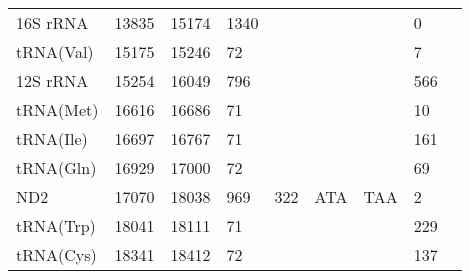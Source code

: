 \documentclass[../DISSERTACAO_MAIN.tex]{subfiles}
\begin{document}
\begin{longtable}{llllllllllllllllllllll}
			16S 				rRNA & \multicolumn{2}{l}{13835}   & \multicolumn{2}{l}{15174}   & \multicolumn{2}{l}{1340}        & \multicolumn{3}{l}{}                          & \multicolumn{3}{l}{}      & \multicolumn{3}{l}{}        & \multicolumn{3}{l}{0}           & \multicolumn{3}{l}{}         \\
			tRNA(Val)    & \multicolumn{2}{l}{15175}   & \multicolumn{2}{l}{15246}   & \multicolumn{2}{l}{72}          & \multicolumn{3}{l}{}                          & \multicolumn{3}{l}{}      & \multicolumn{3}{l}{}        & \multicolumn{3}{l}{7}           & \multicolumn{3}{l}{}         \\
			12S 				rRNA & \multicolumn{2}{l}{15254}   & \multicolumn{2}{l}{16049}   & \multicolumn{2}{l}{796}         & \multicolumn{3}{l}{}                          & \multicolumn{3}{l}{}      & \multicolumn{3}{l}{}        & \multicolumn{3}{l}{566}         & \multicolumn{3}{l}{}         \\
			tRNA(Met)    & \multicolumn{2}{l}{16616}   & \multicolumn{2}{l}{16686}   & \multicolumn{2}{l}{71}          & \multicolumn{3}{l}{}                          & \multicolumn{3}{l}{}      & \multicolumn{3}{l}{}        & \multicolumn{3}{l}{10}          & \multicolumn{3}{l}{}         \\
			tRNA(Ile)    & \multicolumn{2}{l}{16697}   & \multicolumn{2}{l}{16767}   & \multicolumn{2}{l}{71}          & \multicolumn{3}{l}{}                          & \multicolumn{3}{l}{}      & \multicolumn{3}{l}{}        & \multicolumn{3}{l}{161}         & \multicolumn{3}{l}{}         \\
			tRNA(Gln)    & \multicolumn{2}{l}{16929}   & \multicolumn{2}{l}{17000}   & \multicolumn{2}{l}{72}          & \multicolumn{3}{l}{}                          & \multicolumn{3}{l}{}      & \multicolumn{3}{l}{}        & \multicolumn{3}{l}{69}          & \multicolumn{3}{l}{}         \\
			ND2          & \multicolumn{2}{l}{17070}   & \multicolumn{2}{l}{18038}   & \multicolumn{2}{l}{969}         & \multicolumn{3}{l}{322}                       & \multicolumn{3}{l}{ATA}   & \multicolumn{3}{l}{TAA}     & \multicolumn{3}{l}{2}           & \multicolumn{3}{l}{}         \\
			tRNA(Trp)    & \multicolumn{2}{l}{18041}   & \multicolumn{2}{l}{18111}   & \multicolumn{2}{l}{71}          & \multicolumn{3}{l}{}                          & \multicolumn{3}{l}{}      & \multicolumn{3}{l}{}        & \multicolumn{3}{l}{229}         & \multicolumn{3}{l}{}         \\
			tRNA(Cys)    & \multicolumn{2}{l}{18341}   & \multicolumn{2}{l}{18412}   & \multicolumn{2}{l}{72}          & \multicolumn{3}{l}{}                          & \multicolumn{3}{l}{}      & \multicolumn{3}{l}{}        & \multicolumn{3}{l}{137}         & \multicolumn{3}{l}{}         \\

\end{longtable}
\end{document}
